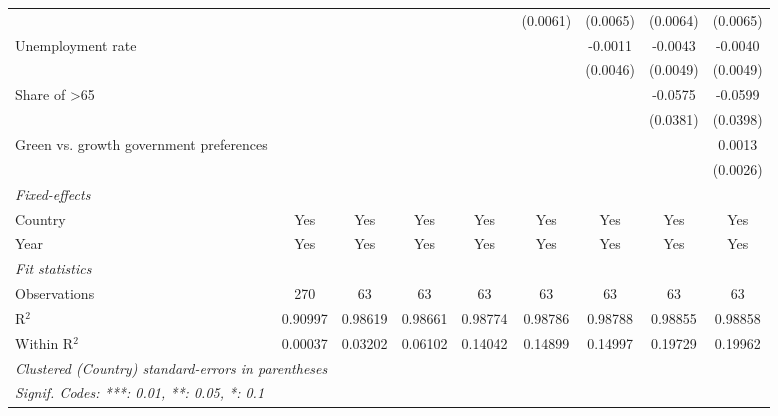 \begin{table}[htbp]
\begin{tabular}{lcccccccc}
                                                                &          &          &          &                & (0.0061)       & (0.0065)       & (0.0064)       & (0.0065)\\   
      Unemployment rate                                         &          &          &          &                &                & -0.0011        & -0.0043        & -0.0040\\   
                                                                &          &          &          &                &                & (0.0046)       & (0.0049)       & (0.0049)\\   
      Share of >65                                              &          &          &          &                &                &                & -0.0575        & -0.0599\\   
                                                                &          &          &          &                &                &                & (0.0381)       & (0.0398)\\   
      Green vs. growth government preferences                   &          &          &          &                &                &                &                & 0.0013\\   
                                                                &          &          &          &                &                &                &                & (0.0026)\\   
      \midrule
      \emph{Fixed-effects}\\
      Country                                                   & Yes      & Yes      & Yes      & Yes            & Yes            & Yes            & Yes            & Yes\\  
      Year                                                      & Yes      & Yes      & Yes      & Yes            & Yes            & Yes            & Yes            & Yes\\  
      \midrule
      \emph{Fit statistics}\\
      Observations                                              & 270      & 63       & 63       & 63             & 63             & 63             & 63             & 63\\  
      R$^2$                                                     & 0.90997  & 0.98619  & 0.98661  & 0.98774        & 0.98786        & 0.98788        & 0.98855        & 0.98858\\  
      Within R$^2$                                              & 0.00037  & 0.03202  & 0.06102  & 0.14042        & 0.14899        & 0.14997        & 0.19729        & 0.19962\\  
      \midrule \midrule
      \multicolumn{9}{l}{\emph{Clustered (Country) standard-errors in parentheses}}\\
      \multicolumn{9}{l}{\emph{Signif. Codes: ***: 0.01, **: 0.05, *: 0.1}}\\
   \end{tabular}
\end{table}


